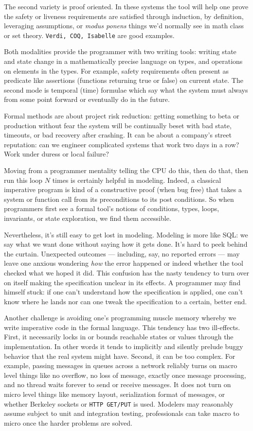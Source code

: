 \documentclass[twocolumn]{article}
\begin{document}
The second variety is proof oriented. In these systems the tool will help one prove the safety or liveness requirements are satisfied through induction, by definition, leveraging assumptions, or \emph{modus ponens} things we'd normally see in math class or set theory. \texttt{Verdi, COQ, Isabelle} are good examples.

Both modalities provide the programmer with two writing tools: writing state and state change in a mathematically precise language on types, and operations on elements in the types. For example, safety requirements often present as predicate like assertions (functions returning true or false) on current state. The second mode is temporal (time) formulae which say what the system must always from some point forward or eventually do in the future.  

Formal methods are about project risk reduction: getting something to beta or production without fear the system will be continually beset with bad state, timeouts, or bad recovery after crashing. It can be about a company's street reputation: can we engineer complicated systems that work two days in a row? Work under duress or local failure?

Moving from a programmer mentality telling the CPU do this, then do that, then run this loop $N$ times is certainly helpful in modeling. Indeed, a classical imperative program is kind of a constructive proof (when bug free) that takes a system or function call from its preconditions to its post conditions. So when programmers first see a formal tool's notions of conditions, types, loops, invariants, or state exploration, we find them accessible. 

Nevertheless, it's still easy to get lost in modeling. Modeling is more like SQL: we say what we want done without saying how it gets done. It's hard to peek behind the curtain. Unexpected outcomes --- including, say, no reported errors --- may leave one anxious wondering \emph{how} the error happened or indeed whether the tool checked what we hoped it did. This confusion has the nasty tendency to turn over on itself making the specification unclear in its effects. A programmer may find himself stuck: if one can't understand how the specification is applied, one can't know where he lands nor can one tweak the specification to a certain, better end.

Another challenge is avoiding one's programming muscle memory whereby we write imperative code in the formal language. This tendency has two ill-effects. First, it necessarily locks in or bounds reachable states or values through the implementation. In other words it tends to implicitly and silently prelude buggy behavior that the real system might have. Second, it can be too complex. For example, passing messages in queues across a network reliably turns on macro level things like no overflow, no loss of message, exactly once message processing, and no thread waits forever to send or receive messages. It does not turn on micro level things like memory layout, serialization format of messages, or whether Berkeley sockets or \texttt{HTTP GET/PUT} is used. Modelers may reasonably assume subject to unit and integration testing, professionals can take macro to micro once the harder problems are solved.
\end{document}
